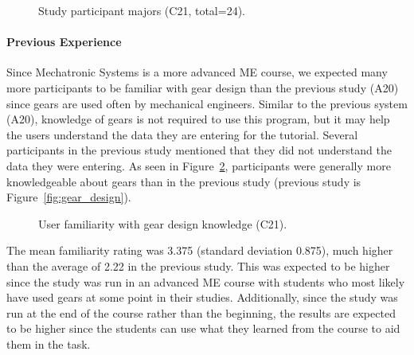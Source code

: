 \begin{doublespace}
\begin{figure}[htbp]
    \centering
    \caption{Study participant majors (C21, total=24).}
    \label{fig:majors_first}
\end{figure}

\paragraph{Previous Experience}
Since Mechatronic Systems is a more advanced ME course, we expected many more participants to be familiar with gear design than the previous study (A20) since gears are used often by mechanical engineers. Similar to the previous system (A20), knowledge of gears is not required to use this program, but it may help the users understand the data they are entering for the tutorial. Several participants in the previous study mentioned that they did not understand the data they were entering. As seen in Figure~\ref{fig:gear_first}, participants were generally more knowledgeable about gears than in the previous study (previous study is Figure~\ref{fig:gear_design}).

\begin{figure}[htbp]
    \centering
    \caption{User familiarity with gear design knowledge (C21).}
    \label{fig:gear_first}
\end{figure}

The mean familiarity rating was 3.375 (standard deviation 0.875), much higher than the average of 2.22 in the previous study. This was expected to be higher since the study was run in an advanced ME course with students who most likely have used gears at some point in their studies. Additionally, since the study was run at the end of the course rather than the beginning, the results are expected to be higher since the students can use what they learned from the course to aid them in the task.


\end{doublespace}
